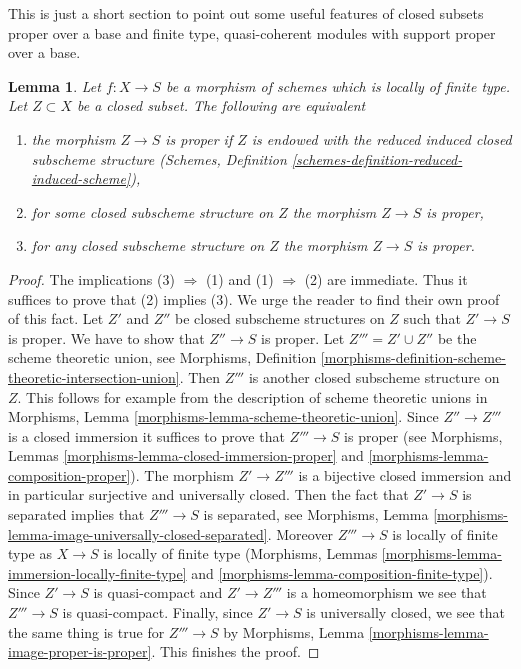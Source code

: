 \documentclass{stacks-project}
\theoremstyle{plain}
\newtheorem{lemma}[subsection]{Lemma}
\theoremstyle{definition}
\theoremstyle{remark}
\numberwithin{equation}{subsection}
\begin{document}
\noindent
This is just a short section to point out some useful features
of closed subsets proper over a base and finite type, quasi-coherent
modules with support proper over a base.

\begin{lemma}
\label{lemma-closed-proper-over-base}
Let $f : X \to S$ be a morphism of schemes which is locally of finite type.
Let $Z \subset X$ be a closed subset. The following are equivalent
\begin{enumerate}
\item the morphism $Z \to S$ is proper if $Z$ is endowed with the reduced
induced closed subscheme structure
(Schemes, Definition \ref{schemes-definition-reduced-induced-scheme}),
\item for some closed subscheme structure on $Z$ the morphism $Z \to S$
is proper,
\item for any closed subscheme structure on $Z$ the morphism
$Z \to S$ is proper.
\end{enumerate}
\end{lemma}

\begin{proof}
The implications (3) $\Rightarrow$ (1) and (1) $\Rightarrow$ (2)
are immediate. Thus it suffices to prove that (2) implies (3).
We urge the reader to find their own proof of this fact.
Let $Z'$ and $Z''$ be closed subscheme structures on $Z$
such that $Z' \to S$ is proper. We have to show that $Z'' \to S$ is proper.
Let $Z''' = Z' \cup Z''$ be the scheme theoretic union, see
Morphisms, Definition
\ref{morphisms-definition-scheme-theoretic-intersection-union}.
Then $Z'''$ is another closed subscheme structure on $Z$.
This follows for example from the description of scheme theoretic unions in
Morphisms, Lemma \ref{morphisms-lemma-scheme-theoretic-union}.
Since $Z'' \to Z'''$ is a closed immersion it suffices to prove
that $Z''' \to S$ is proper (see
Morphisms, Lemmas \ref{morphisms-lemma-closed-immersion-proper} and
\ref{morphisms-lemma-composition-proper}).
The morphism $Z' \to Z'''$ is a bijective closed immersion
and in particular surjective and universally closed.
Then the fact that $Z' \to S$ is separated implies that
$Z''' \to S$ is separated, see
Morphisms, Lemma \ref{morphisms-lemma-image-universally-closed-separated}.
Moreover $Z''' \to S$ is locally of finite type
as $X \to S$ is locally of finite type
(Morphisms, Lemmas \ref{morphisms-lemma-immersion-locally-finite-type} and
\ref{morphisms-lemma-composition-finite-type}).
Since $Z' \to S$ is quasi-compact and $Z' \to Z'''$ is a homeomorphism
we see that $Z''' \to S$ is quasi-compact.
Finally, since $Z' \to S$ is universally closed, we see that
the same thing is true for $Z''' \to S$ by
Morphisms, Lemma \ref{morphisms-lemma-image-proper-is-proper}.
This finishes the proof.
\end{proof}
\end{document}
